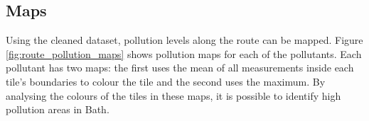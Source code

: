 \documentclass[11pt,twosided,a4paper]{report}
\begin{document}



\subsection{Maps}

Using the cleaned dataset, pollution levels along the route can be mapped. Figure \ref{fig:route_pollution_maps} shows pollution maps for each of the pollutants. Each pollutant has two maps: the first uses the mean of all measurements inside each tile's boundaries to colour the tile and the second uses the maximum. By analysing the colours of the tiles in these maps, it is possible to identify high pollution areas in Bath.
\end{document}
